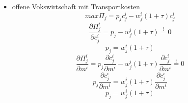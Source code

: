 \begin{itemize}
\item \underline{offene Vokswirtschaft mit Transportkosten}
\begin{equation} max\Pi_j=p_jc^i_j-w^i_j (1+\tau) c^i_j\end{equation}
\begin{equation}\frac{\partial \Pi^i_j}{\partial c^i_j}=p_j-w^i_j(1+\tau)\overset{!}{=}0\end{equation}
\begin{equation}p_j=w^i_j(1+\tau)\end{equation}
\begin{equation}\frac{\partial \Pi^i_j}{\partial m^i}=p_j\frac{\partial c^i_j}{\partial m^i}-w^i_j (1+\tau)\frac{\partial c^i_j}{\partial m^i}\overset{!}{=}0\end{equation}
\begin{displaymath}p_j\frac{\partial c^i_j}{\partial m^i}=w^i_j (1+\tau)\frac{\partial c^i_j}{\partial m^i}\end{displaymath}
\begin{equation}p_j=w^i_j (1+\tau)\end{equation}
\begin{flushright}
\begin{center}
\end{center}
\end{flushright}
\end{itemize}

